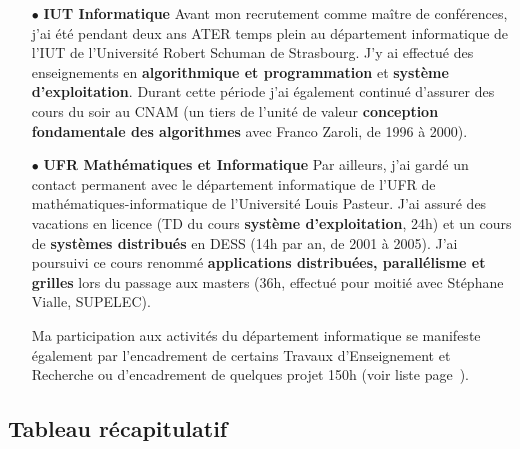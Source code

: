 \documentclass[11pt]{article}
\begin{document}
\noindent
\begin{itemize}
\item[$\bullet$] \textbf{IUT Informatique}
Avant mon recrutement comme maître de conférences, j'ai été pendant deux ans ATER temps plein
au département informatique de l'IUT de l'Université Robert Schuman de Strasbourg.
J'y ai effectué des enseignements en \textbf{algorithmique et programmation} et 
\textbf{système d'exploitation}. Durant cette période j'ai également continué 
d'assurer des cours du soir au CNAM 
(un tiers de l'unité de valeur \textbf{conception fondamentale des algorithmes} 
avec Franco Zaroli, de 1996 à 2000).\\

\item[$\bullet$] \textbf{UFR Mathématiques et Informatique}
Par ailleurs, j'ai gardé un contact permanent avec le département informatique 
de l'UFR de mathématiques-informatique de l'Université Louis Pasteur. 
J'ai assuré des vacations en licence (TD du cours \textbf{système d'exploitation}, 24h)
et un cours de \textbf{systèmes distribués} en DESS (14h par an, de 2001 à 2005).
J'ai poursuivi ce cours renommé \textbf{applications distribuées, parallélisme et grilles}
lors du passage aux masters (36h, effectué pour moitié avec Stéphane Vialle, SUPELEC).


Ma participation aux activités du département informatique se manifeste également par 
l'encadrement de certains Travaux d'Enseignement et Recherche ou d'encadrement 
de quelques projet 150h (voir liste page~\pageref{sc:encadre-autres}).
\end{itemize}




\subsection{Tableau récapitulatif}
\label{sc:tab-ens}
\end{document}
